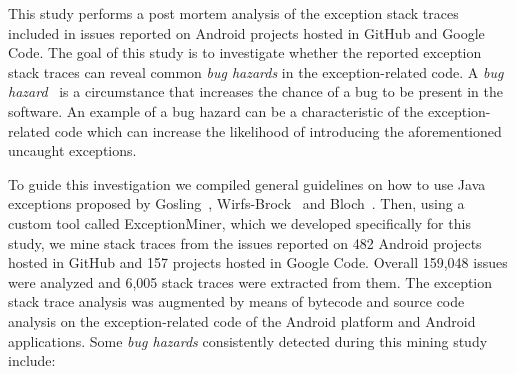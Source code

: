 \documentclass[conference]{IEEEtran}
\begin{document}

This study performs a post mortem analysis of the exception stack traces 
included in issues
reported on Android projects hosted in GitHub and Google Code. 
The goal of this study is to investigate whether the reported exception stack traces
 can reveal common \emph{bug hazards} in the exception-related code.  
A \emph{bug hazard}~\cite{binder2000testing}  is a circumstance that increases the 
chance of a bug to be present in the software. An example of a bug hazard can 
be a characteristic of  the exception-related code which can increase the likelihood 
of introducing the aforementioned uncaught exceptions.

To guide this investigation we compiled general guidelines on how to use Java
exceptions proposed by Gosling~\cite{gosling2000java},
Wirfs-Brock~\cite{wirfs2006toward} and Bloch~\cite{bloch2008effective}.
Then, using a custom tool called ExceptionMiner,
 which we developed specifically for this study, we mine stack traces from the issues reported 
on 482 Android projects hosted in GitHub and 157 projects hosted in Google Code.
Overall 159,048 issues were analyzed and 6,005 stack traces were extracted from them.
The exception stack trace analysis was augmented by means of bytecode 
and source code analysis on the exception-related code of the Android 
platform and Android applications. Some \emph{bug hazards} consistently detected 
during this mining study include:
\end{document}
